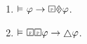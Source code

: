 \documentclass[a4paper, 11pt]{article}                  %
\begin{document}
\begin{enumerate}
    \item $\MLmodels[] \metaA \rightarrow \Past \future \metaA$.

    \item $\MLmodels[] \Future\Past\metaA \rightarrow \always\metaA$.

\end{enumerate}


\end{document}
